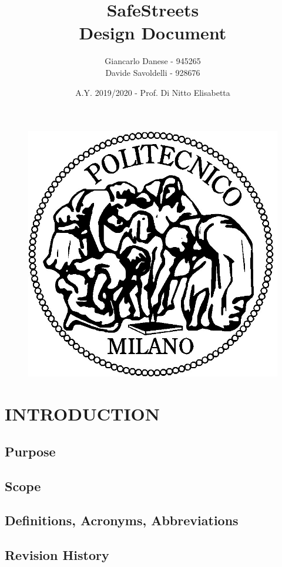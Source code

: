 \documentclass[12pt,a4paper]{article}
\author{Giancarlo Danese - 945265\\
	Davide Savoldelli - 928676}
\date{A.Y. 2019/2020 - Prof. Di Nitto Elisabetta}
\title{
	\textbf{\Huge{SafeStreets}} \\
	\large Design Document
}
\begin{document}
	\begin{figure}
		\centering
		\includegraphics[width=1.0\linewidth]{assets/images/logo_poli.jpg}
	\end{figure}

	\maketitle
	\newpage
	\tableofcontents
	\newpage

\section{INTRODUCTION}
\subsection{Purpose}
\subsection{Scope}
\subsection{Definitions, Acronyms, Abbreviations}
\subsection{Revision History}
\end{document}
